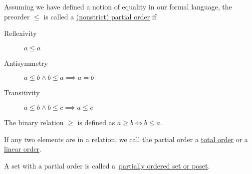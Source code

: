 \begin{definition}
\begin{defenum}
    \item\label{def:orders:partial} Assuming we have defined a notion of equality in our formal language, the preorder $\leq$ is called a \uline{(nonstrict) partial order} if
    \begin{description}
      \item[Reflexivity] $a \leq a$
      \item[Antisymmetry] $a \leq b \land b \leq a \implies a = b$
      \item[Transitivity] $a \leq b \land b \leq c \implies a \leq c$
    \end{description}

    The binary relation $\geq$ is defined as $a \geq b \iff b \leq a$.

    If any two elements are in a relation, we call the partial order a \uline{total order} or a \uline{linear order}.

    A set with a partial order is called a~\uline{partially ordered set or poset}.
  \end{defenum}
\end{definition}

